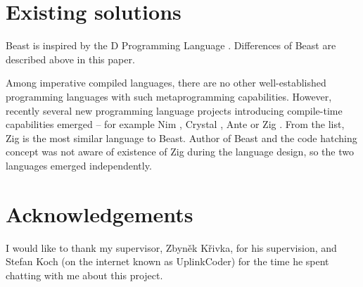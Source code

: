 \documentclass{ExcelAtFIT}
\begin{document}
\begin{comment}
There is still a big difference between \ctime and \nonctime variables. First, this "runtime mirroring" is not necessary at all in a lot of practical use cases. Second, the mirroring can be a lot faster than runtime execution -- mirroring does not require the evaluation to be done at runtime, a simple memory overwrite with newer values (and only where the \ctime data changed since the last mirroring) is enough.

The compiler has a virtual memory address space that is used during interpretation. This address space is different from the address space of an output binary file. Since it is possible to have references (and pointers) during compile time, it is necessary to implement address translation between these two address spaces. Because of that, the compiler has to know what data in the virtual memory is a reference, because values of \ctime references are changed during the linking process. This is realized by dedicated interpreter instructions called within reference (pointer) constructor/destructors that mark/unmark the memory as a reference.

This text briefly describes all key components necessary to implement the code hatching concept. More in-depth analysis can be found in bachelor thesis downloadable from the Git repository.
\end{comment} 

\section{Existing solutions}
Beast is inspired by the D Programming Language \cite{DLang}. Differences of Beast are described above in this paper.

Among imperative compiled languages, there are no other well-established programming languages with such metaprogramming capabilities. However, recently several new programming language projects introducing compile-time capabilities emerged -- for example Nim \cite{NimLang}, Crystal \cite{CrystalLang}, Ante \cite{AnteLang} or Zig \cite{ZigLang}. From the list, Zig is the most similar language to Beast. Author of Beast and the code hatching concept was not aware of existence of Zig during the language design, so the two languages emerged independently.

\section*{Acknowledgements}
I would like to thank my supervisor, Zbyněk Křivka, for his supervision, and Stefan Koch (on the internet known as UplinkCoder) for the time he spent chatting with me about this project.
\end{document}
